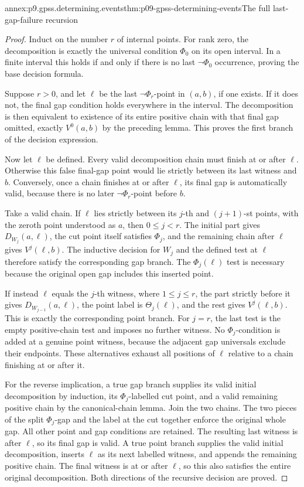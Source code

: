 \begin{annexitem}{annex:p9.gpss.determining.events}{thm:p09-gpss-determining-events}{The full last-gap-failure recursion}
\begin{proof}
Induct on the number \(r\) of internal points.
For rank zero, the decomposition is exactly the
universal condition \(\Phi_0\) on its open
interval. In a finite interval this holds if
and only if there is no last \(\neg\Phi_0\)
occurrence, proving the base decision formula.

Suppose \(r>0\), and let \(\ell\) be the
last \(\neg\Phi_r\)-point in \((a,b)\),
if one exists. If it does not, the final gap
condition holds everywhere in the interval.
The decomposition is then equivalent to
existence of its entire positive chain with
that final gap omitted, exactly \(V^0(a,b)\)
by the preceding lemma. This proves the first
branch of the decision expression.

Now let \(\ell\) be defined. Every valid
decomposition chain must finish at or after
\(\ell\). Otherwise this false final-gap
point would lie strictly between its last
witness and \(b\). Conversely, once a chain
finishes at or after \(\ell\), its final
gap is automatically valid, because there
is no later \(\neg\Phi_r\)-point before
\(b\).

Take a valid chain. If \(\ell\) lies
strictly between its \(j\)-th and
\((j+1)\)-st points, with the zeroth
point understood as \(a\), then
\(0\leq j<r\). The initial part gives
\(D_{W_j}(a,\ell)\), the cut point
itself satisfies \(\Phi_j\), and the
remaining chain after \(\ell\) gives
\(V^{j}(\ell,b)\). The inductive
decision for \(W_j\) and the defined
test at \(\ell\) therefore satisfy
the corresponding gap branch. The
\(\Phi_j(\ell)\) test is necessary
because the original open gap includes
this inserted point.

If instead \(\ell\) equals the
\(j\)-th witness, where \(1\leq j\leq r\),
the part strictly before it gives
\(D_{W_{j-1}}(a,\ell)\), the point
label is \(\Theta_j(\ell)\), and
the rest gives \(V^{j}(\ell,b)\).
This is exactly the corresponding
point branch. For \(j=r\), the
last test is the empty positive-chain
test and imposes no further witness.
No \(\Phi_j\)-condition is added
at a genuine point witness, because
the adjacent gap universals exclude
their endpoints. These alternatives
exhaust all positions of \(\ell\)
relative to a chain finishing at
or after it.

For the reverse implication, a true
gap branch supplies its valid initial
decomposition by induction, its
\(\Phi_j\)-labelled cut point,
and a valid remaining positive chain
by the canonical-chain lemma. Join
the two chains. The two pieces of
the split \(\Phi_j\)-gap and the
label at the cut together enforce
the original whole gap. All other
point and gap conditions are retained.
The resulting last witness is after
\(\ell\), so its final gap is
valid. A true point branch supplies
the valid initial decomposition,
inserts \(\ell\) as its next
labelled witness, and appends the
remaining positive chain. The final
witness is at or after \(\ell\),
so this also satisfies the entire
original decomposition. Both
directions of the recursive decision
are proved.


\end{proof}
\end{annexitem}
